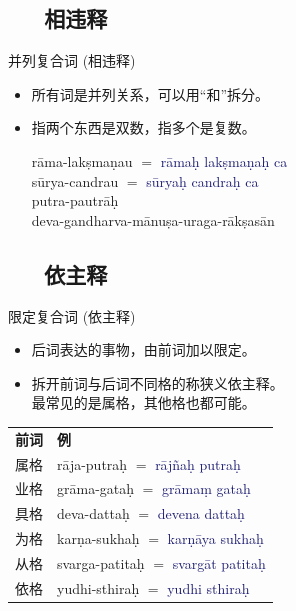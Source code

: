 \documentclass[17pt]{beamer}
\newcommand{\fullpada}[1]{\textcolor{OliveGreen}{#1}}
\newcommand{\fullsentence}[1]{\textcolor{MidnightBlue}{#1}}
\begin{document}
\subsection{~~~相违释}
\begin{frame}{并列复合词 (相违释)}
  \small
  \begin{itemize}
    \item 所有词是并列关系，可以用“和”拆分。
    \item 指两个东西是双数，指多个是复数。\\
    \bigskip

    \fullpada{rāma-lakṣmaṇau} 
      $=$ \fullsentence{rāmaḥ lakṣmaṇaḥ ca}\\
    \fullpada{sūrya-candrau} $=$ \fullsentence{sūryaḥ candraḥ ca}\\
    \fullpada{putra-pautrāḥ} \\
    \fullpada{deva\nobreakdash-gandharva\nobreakdash-mānuṣa\nobreakdash-uraga\nobreakdash-rākṣasān} \\
  \end{itemize}
\end{frame}

\subsection{~~~依主释}
\begin{frame}{限定复合词 (依主释)}
  \small
  \begin{itemize}
    \item 后词表达的事物，由前词加以限定。
    \item 拆开前词与后词不同格的称狭义依主释。\\
    最常见的是属格，其他格也都可能。\\
  \end{itemize}
   \centering
  \begin{tabular}{@{}ll@{}} %
    \textbf{前词} & \textbf{例} \\    
    属格 & \fullpada{rāja\nobreakdash-putraḥ} $=$ \fullsentence{rājñaḥ putraḥ} \\
    业格 &\fullpada{grāma\nobreakdash-gataḥ} $=$ \fullsentence{grāmaṃ gataḥ} \\
    具格 & \fullpada{deva\nobreakdash-dattaḥ} $=$ \fullsentence{devena dattaḥ} \\
    为格 & \fullpada{karṇa\nobreakdash-sukhaḥ} $=$ \fullsentence{karṇāya sukhaḥ} \\
    从格 & \fullpada{svarga\nobreakdash-patitaḥ} $=$ \fullsentence{svargāt patitaḥ} \\
    依格 & \fullpada{yudhi\nobreakdash-sthiraḥ} $=$ \fullsentence{yudhi sthiraḥ} \\
  \end{tabular}
\end{frame}
\end{document}
